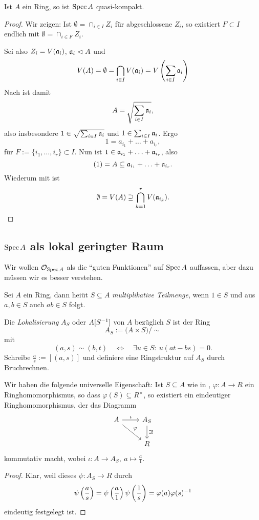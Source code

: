 \begin{satz}
	Ist $A$ ein Ring, so ist $\operatorname{Spec} A$ quasi-kompakt.
\end{satz}
\begin{proof}
	Wir zeigen: Ist $\emptyset = \cap_{i\in I} Z_i$ für abgeschlossene
	$Z_i$, so existiert $F\subset I$ endlich mit
	$\emptyset = \cap_{i\in F} Z_i$.
	
	Sei also $Z_i = V(\mathfrak{a}_i)$, $\mathfrak{a}_i \vartriangleleft A$ und
	\[
		V(A) = \emptyset = \bigcap_{i\in I} V(\mathfrak{a}_i)
		= V\left(\sum_{i\in I} \mathfrak{a}_i\right)
	\]
	Nach  ist damit
	\[
		A = \sqrt{\sum_{i\in I} \mathfrak{a}_i},
	\]
	also insbesondere $1 \in \sqrt{\sum_{i\in I} \mathfrak{a}_i}$ und
	$1 \in \sum_{i\in I} \mathfrak{a}_i$. Ergo
	\[
		1 = a_{i_1} + \ldots + a_{i_r},
	\]
	für $F:= \{i_1, \ldots, i_r\} \subset I$.
	Nun ist
	$1 \in \mathfrak{a}_{i_1} + \ldots + \mathfrak{a}_{i_r}$,
	also 
	\[
		(1) = A \subseteq \mathfrak{a}_{i_1} + \ldots + \mathfrak{a}_{i_r}.
	\]
	Wiederum mit  ist
	\[
		\emptyset = V(A) \supseteq \bigcap_{k=1}^r V(\mathfrak{a}_{i_k}).
	\] 
\end{proof}

\subsection{$\operatorname{Spec} A$ als lokal geringter Raum}

Wir wollen $\mathcal{O}_{\operatorname{Spec} A}$ als die "`guten Funktionen"' auf $\operatorname{Spec} A$ auffassen,
aber dazu müssen wir es besser verstehen. 

\begin{definition}
	\label{def:lokalisierung}
	Sei $A$ ein Ring, dann heiüt $S\subseteq A$ \emph{multiplikative Teilmenge},
	wenn $1\in S$ und aus $a,b\in S$ auch $ab\in S$ folgt.
	
	Die \emph{Lokalisierung} $A_S$ oder $A[S^{-1}]$ von $A$ bezüglich $S$ ist
	der Ring
	\[
		A_S := \big(A \times S \big) \big/ \sim
	\]
	mit
	\[
		(a,s) \sim (b,t) \quad\Leftrightarrow\quad
		\exists u \in S:\ u(at - bs) = 0.
	\]
	Schreibe $\frac a s := [(a,s)]$ und definiere eine Ringstruktur auf
	$A_S$ durch Bruchrechnen.
\end{definition}

\begin{lemma}
	\label{lemma:universelle eigenschaft lokalisierung}
	Wir haben die folgende universelle Eigenschaft: Ist
	$S\subseteq A$ wie in , $\varphi: A \to R$
	ein Ringhomomorphismus, so dass $\varphi(S) \subseteq R^\times$, so
	existiert ein eindeutiger Ringhomomorphismus, der das
	Diagramm
	\[\begin{tikzcd}
		A \rar{\iota} \arrow{dr}{\varphi} & A_S \dar{\exists!} \\
		& R
	\end{tikzcd}\]
	kommutativ macht, wobei
	$\iota: A \to A_S,\ a \mapsto \frac a 1$.
\end{lemma}
\begin{proof}
	Klar, weil dieses $\psi: A_S \to R$ durch
	\[
		\psi\left(\frac a s\right) = 
		\psi\left(\frac a 1\right) \psi\left(\frac 1 s\right) =
		\varphi(a) \varphi(s)^{-1}
	\]
	eindeutig festgelegt ist.
\end{proof}

